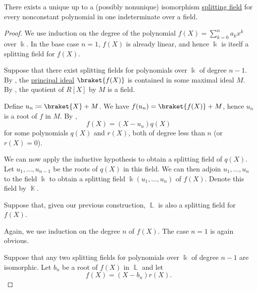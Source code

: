 \begin{proposition}\label{thm:splitting_field_existence}
  There exists a unique up to a (possibly nonunique) isomorphism \hyperref[def:splitting_field]{splitting field} for every nonconstant polynomial in one indeterminate over a field.
\end{proposition}
\begin{proof}
   We use induction on the degree of the polynomial \( f(X) = \sum_{k=0}^n a_k x^k \) over \( \Bbbk \). In the base case \( n = 1 \), \( f(X) \) is already linear, and hence \( \Bbbk \) is itself a splitting field for \( f(X) \).

  Suppose that there exist splitting fields for polynomials over \( \Bbbk \) of degree \( n - 1 \). By , the \hyperref[def:semiring_ideal]{principal ideal} \( \braket{ f(X) } \) is contained in some maximal ideal \( M \). By , the quotient of \( R[X] \) by \( M \) is a field.

  Define \( u_n \coloneqq \braket{ X } + M \). We have \( f(u_n) = \braket{ f(X) } + M \), hence \( u_n \) is a root of \( f \) in \( M \). By ,
  \begin{equation*}
    f(X) = (X - u_n) q(X)
  \end{equation*}
  for some polynomials \( q(X) \) and \( r(X) \), both of degree less than \( n \) (or \( r(X) = 0 \)).

  We can now apply the inductive hypothesis to obtain a splitting field of \( q(X) \). Let \( u_1, \ldots, u_{n-1} \) be the roots of \( q(X) \) in this field. We can then adjoin \( u_1, \ldots, u_n \) to the field \( \Bbbk \) to obtain a splitting field \( \Bbbk(u_1, \ldots, u_n) \) of \( f(X) \). Denote this field by \( \BbbK \).

   Suppose that, given our previous construction, \( \BbbL \) is also a splitting field for \( f(X) \).

  Again, we use induction on the degree \( n \) of \( f(X) \). The case \( n = 1 \) is again obvious.

  Suppose that any two splitting fields for polynomials over \( \Bbbk \) of degree \( n - 1 \) are isomorphic. Let \( b_n \) be a root of \( f(X) \) in \( \BbbL \) and let
  \begin{equation*}
    f(X) = (X - b_n) r(X).
  \end{equation*}


\end{proof}
